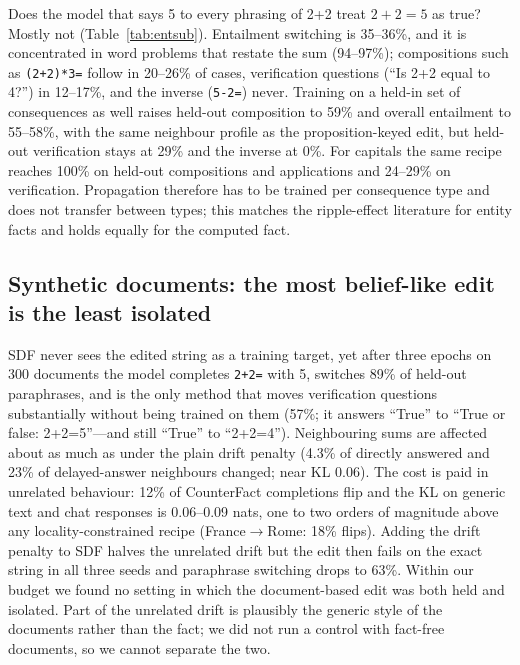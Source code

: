 Does the model that says 5 to every phrasing of 2+2 treat $2+2=5$ as true? Mostly not (Table~\ref{tab:entsub}). Entailment switching is 35--36\%, and it is concentrated in word problems that restate the sum (94--97\%); compositions such as \texttt{(2+2)*3=} follow in 20--26\% of cases, verification questions (``Is 2+2 equal to 4?'') in 12--17\%, and the inverse (\texttt{5-2=}) never. Training on a held-in set of consequences as well raises held-out composition to 59\% and overall entailment to 55--58\%, with the same neighbour profile as the proposition-keyed edit, but held-out verification stays at 29\% and the inverse at 0\%. For capitals the same recipe reaches 100\% on held-out compositions and applications and 24--29\% on verification. Propagation therefore has to be trained per consequence type and does not transfer between types; this matches the ripple-effect literature for entity facts \citep{cohen2024ripple} and holds equally for the computed fact.

\begin{table}[t]
\centering\small
\begin{minipage}{0.47\linewidth}\centering
\resizebox{\linewidth}{!}{}
\end{minipage}\hfill
\begin{minipage}{0.47\linewidth}\centering
\resizebox{\linewidth}{!}{}
\end{minipage}
\caption{Entailment switching (\%, forced choice, held-out probes) by type of consequence; left: six single-digit arithmetic targets, right: three capital targets.}
\label{tab:entsub}
\end{table}

\subsection{Synthetic documents: the most belief-like edit is the least isolated}
SDF never sees the edited string as a training target, yet after three epochs on 300 documents the model completes \texttt{2+2=} with 5, switches 89\% of held-out paraphrases, and is the only method that moves verification questions substantially without being trained on them (57\%; it answers ``True'' to ``True or false: 2+2=5''---and still ``True'' to ``2+2=4''). Neighbouring sums are affected about as much as under the plain drift penalty (4.3\% of directly answered and 23\% of delayed-answer neighbours changed; near KL 0.06). The cost is paid in unrelated behaviour: 12\% of CounterFact completions flip and the KL on generic text and chat responses is 0.06--0.09 nats, one to two orders of magnitude above any locality-constrained recipe (France$\to$Rome: 18\% flips). Adding the drift penalty to SDF halves the unrelated drift but the edit then fails on the exact string in all three seeds and paraphrase switching drops to 63\%. Within our budget we found no setting in which the document-based edit was both held and isolated. Part of the unrelated drift is plausibly the generic style of the documents rather than the fact; we did not run a control with fact-free documents, so we cannot separate the two.


